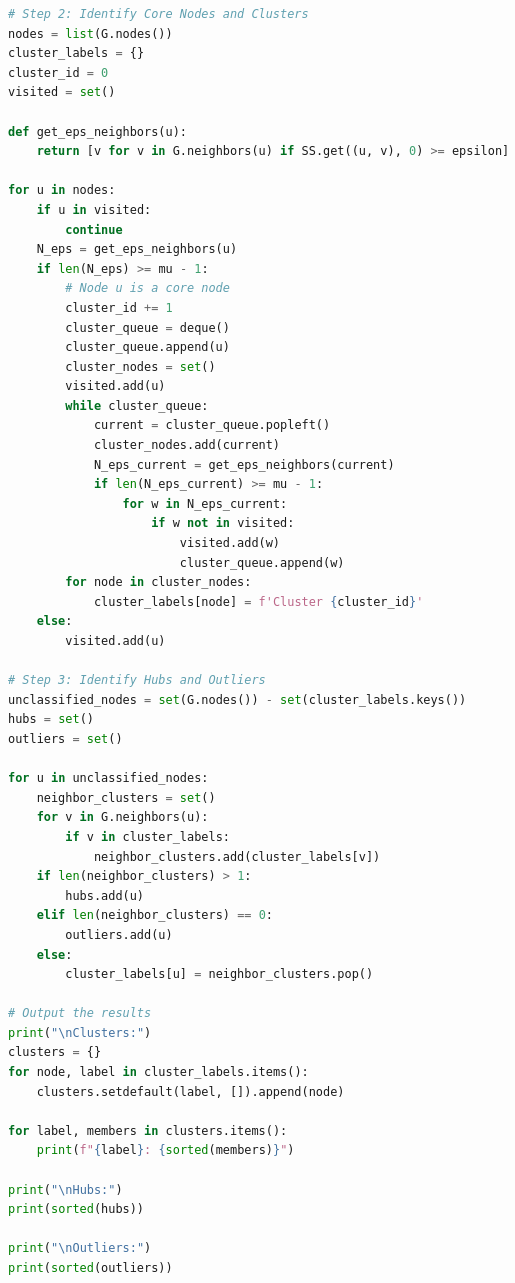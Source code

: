 \documentclass{article}
\begin{document}
\begin{lstlisting}[language=python]
# Step 2: Identify Core Nodes and Clusters
nodes = list(G.nodes())
cluster_labels = {}
cluster_id = 0
visited = set()

def get_eps_neighbors(u):
    return [v for v in G.neighbors(u) if SS.get((u, v), 0) >= epsilon]

for u in nodes:
    if u in visited:
        continue
    N_eps = get_eps_neighbors(u)
    if len(N_eps) >= mu - 1:
        # Node u is a core node
        cluster_id += 1
        cluster_queue = deque()
        cluster_queue.append(u)
        cluster_nodes = set()
        visited.add(u)
        while cluster_queue:
            current = cluster_queue.popleft()
            cluster_nodes.add(current)
            N_eps_current = get_eps_neighbors(current)
            if len(N_eps_current) >= mu - 1:
                for w in N_eps_current:
                    if w not in visited:
                        visited.add(w)
                        cluster_queue.append(w)
        for node in cluster_nodes:
            cluster_labels[node] = f'Cluster {cluster_id}'
    else:
        visited.add(u)

# Step 3: Identify Hubs and Outliers
unclassified_nodes = set(G.nodes()) - set(cluster_labels.keys())
hubs = set()
outliers = set()

for u in unclassified_nodes:
    neighbor_clusters = set()
    for v in G.neighbors(u):
        if v in cluster_labels:
            neighbor_clusters.add(cluster_labels[v])
    if len(neighbor_clusters) > 1:
        hubs.add(u)
    elif len(neighbor_clusters) == 0:
        outliers.add(u)
    else:
        cluster_labels[u] = neighbor_clusters.pop()

# Output the results
print("\nClusters:")
clusters = {}
for node, label in cluster_labels.items():
    clusters.setdefault(label, []).append(node)

for label, members in clusters.items():
    print(f"{label}: {sorted(members)}")

print("\nHubs:")
print(sorted(hubs))

print("\nOutliers:")
print(sorted(outliers))
\end{lstlisting}
\end{document}
